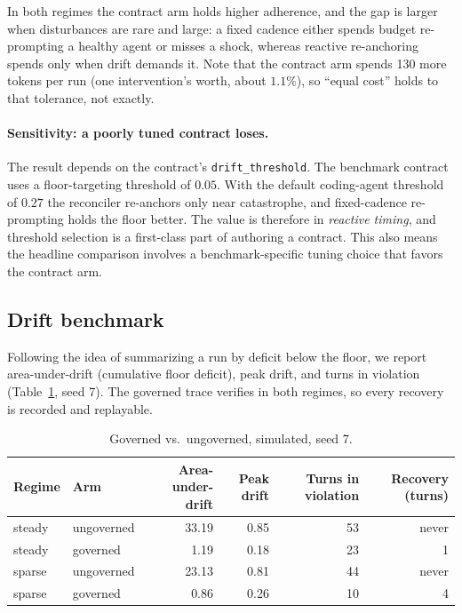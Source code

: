 \documentclass[11pt]{article}
\newcommand{\code}[1]{\texttt{#1}}
\begin{document}
In both regimes the contract arm holds higher adherence, and the gap is larger
when disturbances are rare and large: a fixed cadence either spends budget
re-prompting a healthy agent or misses a shock, whereas reactive re-anchoring
spends only when drift demands it. Note that the contract arm spends 130 more
tokens per run (one intervention's worth, about $1.1\%$), so ``equal cost'' holds
to that tolerance, not exactly.

\paragraph{Sensitivity: a poorly tuned contract loses.}
The result depends on the contract's \code{drift\_threshold}. The benchmark
contract uses a floor-targeting threshold of $0.05$. With the default
coding-agent threshold of $0.27$ the reconciler re-anchors only near catastrophe,
and fixed-cadence re-prompting holds the floor better. The value is therefore in
\emph{reactive timing}, and threshold selection is a first-class part of
authoring a contract. This also means the headline comparison involves a
benchmark-specific tuning choice that favors the contract arm.

\subsection{Drift benchmark}
Following the idea of summarizing a run by deficit below the floor, we report
area-under-drift (cumulative floor deficit), peak drift, and turns in violation
(Table~\ref{tab:drift}, seed 7). The governed trace verifies in both regimes, so
every recovery is recorded and replayable.

\begin{table}[t]
\centering
\caption{Governed vs.\ ungoverned, simulated, seed 7.}
\label{tab:drift}
\begin{tabular}{@{}llrrrr@{}}
\toprule
Regime & Arm & Area-under-drift & Peak drift & Turns in violation & Recovery (turns) \\
\midrule
steady & ungoverned & 33.19 & 0.85 & 53 & never \\
steady & governed   & 1.19  & 0.18 & 23 & 1 \\
sparse & ungoverned & 23.13 & 0.81 & 44 & never \\
sparse & governed   & 0.86  & 0.26 & 10 & 4 \\
\bottomrule
\end{tabular}
\end{table}
\end{document}
